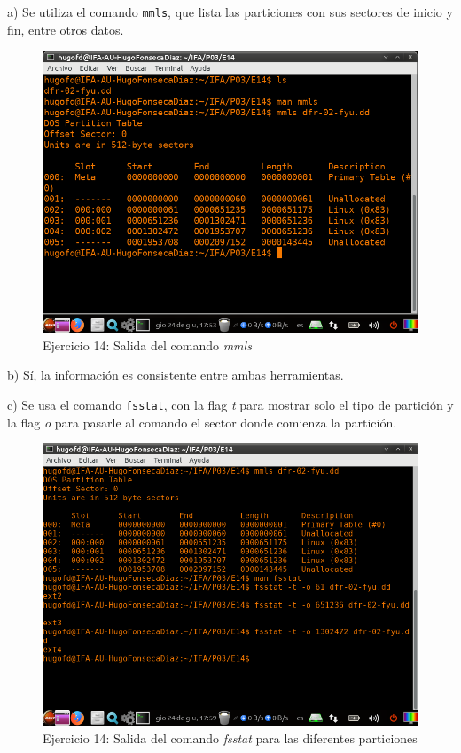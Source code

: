 \documentclass[11pt]{article}
\begin{document}
a) Se utiliza el comando \verb|mmls|, que lista las particiones con sus sectores de inicio y fin, entre otros datos.

\begin{figure}[H]
    \caption{Ejercicio 14: Salida del comando \textit{mmls}}
    \centering
    \includegraphics[scale=0.7]{p03/e14-1.png}
\end{figure}

b) Sí, la información es consistente entre ambas herramientas.

c) Se usa el comando \verb|fsstat|, con la flag \textit{t} para mostrar solo el tipo de partición y la flag \textit{o} para pasarle al comando el sector donde comienza la partición.

\begin{figure}[H]
    \caption{Ejercicio 14: Salida del comando \textit{fsstat} para las diferentes particiones}
    \centering
    \includegraphics[scale=0.7]{p03/e14-2.png}
\end{figure}
\end{document}
